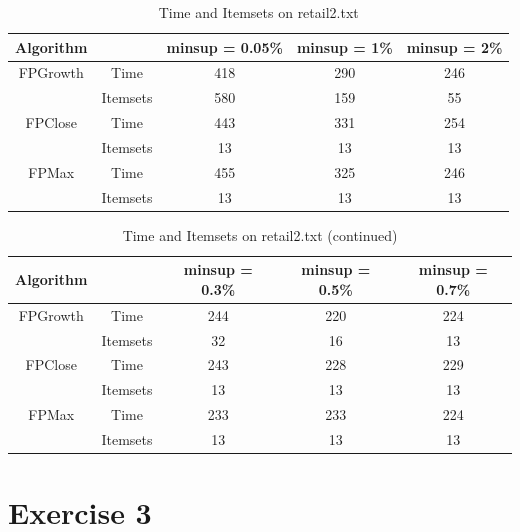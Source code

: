\documentclass[12pt]{article}
\begin{document}
\begin{table}[h]
    \centering
    \begin{tabular}{ |c|c|c|c|c| }
        \hline
        \textbf{Algorithm} & & \textbf{minsup = 0.05\%} & \textbf{minsup = 1\%} & \textbf{minsup = 2\%} \\
        \hline
        \hline
        FPGrowth & Time & 418 & 290 & 246  \\
        & Itemsets & 580 & 159 & 55 \\
        \hline
        FPClose & Time & 443 & 331 & 254 \\
        & Itemsets & 13 & 13 & 13 \\
        \hline
        FPMax & Time & 455 & 325 & 246 \\
        & Itemsets & 13 & 13 & 13 \\
        \hline
        \end{tabular}
    \caption{Time and Itemsets on retail2.txt}
\end{table}

\begin{table}[h]
    \centering
    \begin{tabular}{ |c|c|c|c|c| }
        \hline
        \textbf{Algorithm} & & \textbf{minsup = 0.3\%} & \textbf{minsup = 0.5\%} & \textbf{minsup = 0.7\%} \\
        \hline
        \hline
        FPGrowth & Time & 244 & 220 & 224  \\
        & Itemsets & 32 & 16 & 13 \\
        \hline
        FPClose & Time & 243 & 228 & 229 \\
        & Itemsets & 13 & 13 & 13 \\
        \hline
        FPMax & Time & 233 & 233 & 224 \\
        & Itemsets & 13 & 13 & 13 \\
        \hline
        \end{tabular}
    \caption{Time and Itemsets on retail2.txt (continued)}
\end{table}

\clearpage

\section*{Exercise 3}

\end{document}
